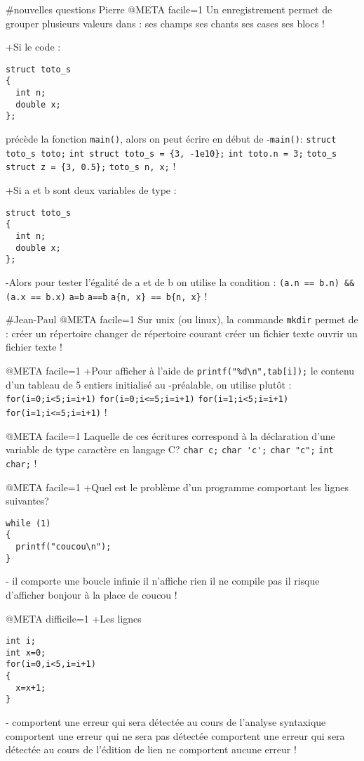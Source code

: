 #nouvelles questions Pierre
@META facile=1
Un enregistrement permet de grouper plusieurs valeurs dans :
 ses champs
 ses chants
 ses cases
 ses blocs
!

+Si le code :
\begin{verbatim}
struct toto_s
{
  int n;
  double x;
};
\end{verbatim}
 précède la fonction \verb+main()+, alors on peut écrire en début de
-\verb|main()|:
 \verb|struct toto_s toto;|
 \verb|int struct toto_s = {3, -1e10};|
 \verb|int toto.n = 3;|
 \verb|toto_s struct z = {3, 0.5};|
 \verb|toto_s n, x;|
!

+Si a et b sont deux variables de type :
\begin{verbatim}
struct toto_s
{
  int n;
  double x;
};
\end{verbatim}
-Alors pour tester l'égalité de a et de b on utilise la condition :
 \verb|(a.n == b.n) && (a.x == b.x)|
 \verb|a=b|
 \verb|a==b|
 \verb|a{n, x} == b{n, x}|
!

#Jean-Paul
@META facile=1
Sur unix (ou linux), la commande \verb|mkdir| permet de :
  créer un répertoire
  changer de répertoire courant
  créer un fichier texte
  ouvrir un fichier texte
!

@META facile=1
+Pour afficher à l'aide de \verb|printf("%d\n",tab[i]);| le contenu d'un tableau de 5 entiers initialisé au
-préalable, on utilise plutôt :
 \verb|for(i=0;i<5;i=i+1)|
 \verb|for(i=0;i<=5;i=i+1)|
 \verb|for(i=1;i<5;i=i+1)|
 \verb|for(i=1;i<=5;i=i+1)|
!

@META facile=1
Laquelle de ces écritures correspond à la déclaration d'une variable de type caractère en langage C?
 \verb|char c;|
 \verb|char 'c';|
 \verb|char "c";|
 \verb|int char;|
!

@META facile=1
+Quel est le problème d'un programme comportant les lignes suivantes?
\begin{verbatim}
while (1)
{
  printf("coucou\n");
}
\end{verbatim}
-
  il comporte une boucle infinie
  il n'affiche rien
  il ne compile pas
  il risque d'afficher bonjour à la place de coucou
!

@META difficile=1
+Les lignes
\begin{verbatim}
int i;
int x=0;
for(i=0,i<5,i=i+1)
{
  x=x+1;
}
\end{verbatim}
-
 comportent une erreur qui sera détectée au cours de l'analyse syntaxique
 comportent une erreur qui ne sera pas détectée
 comportent une erreur qui sera détectée au cours de l'édition de lien
 ne comportent aucune erreur
!
